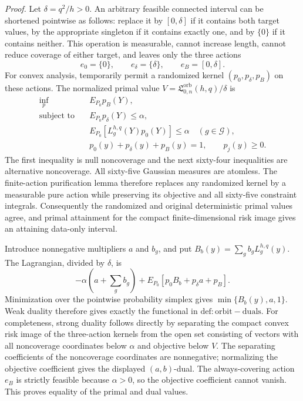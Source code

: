 \textit{Proof.}
Let \(\delta=q^2/h>0\).  An arbitrary feasible connected interval can be
shortened pointwise as follows: replace it by \([0,\delta]\) if it contains
both target values, by the appropriate singleton if it contains exactly one,
and by \(\{0\}\) if it contains neither.  This operation is measurable, cannot
increase length, cannot reduce coverage of either target, and leaves only the
three actions
\[
e_0=\{0\},\qquad e_\delta=\{\delta\},\qquad
e_B=[0,\delta].
\]
For convex analysis, temporarily permit a randomized kernel
\((p_0,p_\delta,p_B)\) on these actions.  The normalized primal value
\(V=\mathfrak L_{0,n}^{\mathrm{orb}}(h,q)/\delta\) is
\[
\begin{split}
\inf_p\quad &E_{P_0}p_B(Y),\\
\text{subject to}\quad
&E_{P_0}p_\delta(Y)\leq\alpha,\\
&E_{P_0}[L_g^{h,q}(Y)p_0(Y)]\leq\alpha
\quad(g\in\mathcal G),\\
&p_0(y)+p_\delta(y)+p_B(y)=1,\qquad p_j(y)\geq0.
\end{split}
\]
The first inequality is null noncoverage and the next sixty-four inequalities
are alternative noncoverage.  All sixty-five Gaussian measures are atomless.
The finite-action purification lemma therefore replaces any randomized kernel
by a measurable pure action while preserving its objective and all sixty-five
constraint integrals.  Consequently the randomized and original deterministic
primal values agree, and primal attainment for the compact finite-dimensional
risk image gives an attaining data-only interval.

Introduce nonnegative multipliers \(a\) and \(b_g\), and put
\(B_b(y)=\sum_gb_gL_g^{h,q}(y)\).  The Lagrangian, divided by \(\delta\), is
\[
-\alpha\!\left(a+\sum_gb_g\right)
+E_{P_0}\!\left[p_0B_b+p_\delta a+p_B\right].
\]
Minimization over the pointwise probability simplex gives
\(\min\{B_b(y),a,1\}\).  Weak duality therefore gives exactly the functional
in \(\mathrm{def:orbit-duals}\).  For completeness, strong duality follows
directly by separating the compact convex risk image of the three-action
kernels from the open set consisting of vectors with all noncoverage
coordinates below \(\alpha\) and objective below \(V\).  The separating
coefficients of the noncoverage coordinates are nonnegative; normalizing the
objective coefficient gives the displayed \((a,b)\)-dual.  The always-covering
action \(e_B\) is strictly feasible because \(\alpha>0\), so the objective
coefficient cannot vanish.  This proves equality of the primal and dual values.

